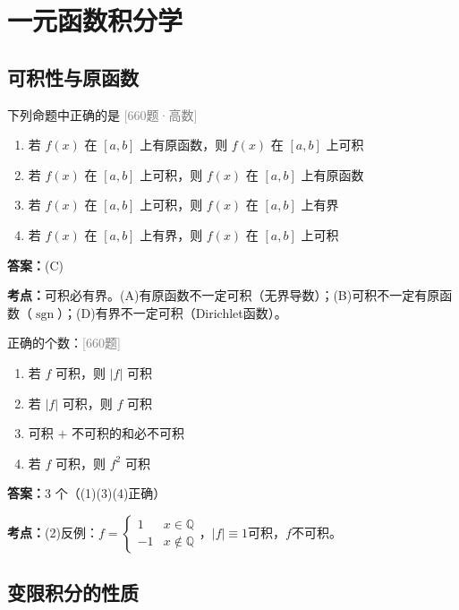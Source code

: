 \documentclass[12pt,a4paper]{ctexbook}
\newcommand{\src}[1]{\hfill\textcolor{gray}{\small\textsf{[#1]}}}
\newcommand{\ans}[1]{\begin{answerbox}\textbf{答案：}#1\end{answerbox}}
\newcommand{\kpt}[1]{\textbf{考点：}#1}
\begin{document}
\newpage

\chapter{一元函数积分学}

\section{可积性与原函数}

\begin{exercise}[660题·可积性与有界性]
下列命题中正确的是 \hfill\src{660题·高数}
\begin{enumerate}[label=(\Alph*),nosep]
  \item 若 $f(x)$ 在 $[a,b]$ 上有原函数，则 $f(x)$ 在 $[a,b]$ 上可积
  \item 若 $f(x)$ 在 $[a,b]$ 上可积，则 $f(x)$ 在 $[a,b]$ 上有原函数
  \item 若 $f(x)$ 在 $[a,b]$ 上可积，则 $f(x)$ 在 $[a,b]$ 上有界
  \item 若 $f(x)$ 在 $[a,b]$ 上有界，则 $f(x)$ 在 $[a,b]$ 上可积
\end{enumerate}
\end{exercise}
\ans{(C)}
\kpt{可积必有界。(A)有原函数不一定可积（无界导数）；(B)可积不一定有原函数（$\operatorname{sgn}$）；(D)有界不一定可积（Dirichlet函数）。}

\bigskip

\begin{exercise}[660题·可积函数运算]
正确的个数：\hfill\src{660题}
\begin{enumerate}[label=(\arabic*),nosep]
  \item 若 $f$ 可积，则 $|f|$ 可积
  \item 若 $|f|$ 可积，则 $f$ 可积
  \item 可积 $+$ 不可积的和必不可积
  \item 若 $f$ 可积，则 $f^2$ 可积
\end{enumerate}
\end{exercise}
\ans{3 个（(1)(3)(4)正确）}
\kpt{(2)反例：$f=\begin{cases}1&x\in\mathbb{Q}\\-1&x\notin\mathbb{Q}\end{cases}$，$|f|\equiv 1$可积，$f$不可积。}

\section{变限积分的性质}
\end{document}
